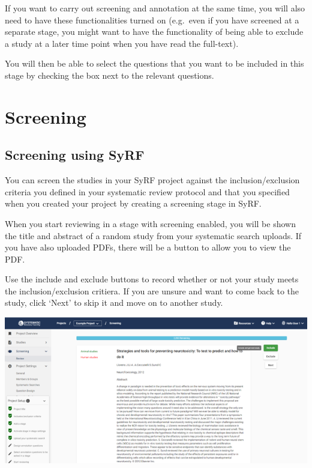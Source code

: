 \documentclass[
]{book}
\begin{document}
If you want to carry out screening and annotation at the same time, you will also need to have these functionalities turned on (e.g.~even if you have screened at a separate stage, you might want to have the functionality of being able to exclude a study at a later time point when you have read the full-text).

You will then be able to select the questions that you want to be included in this stage by checking the box next to the relevant questions.

\hypertarget{projectscreening}{%
\chapter{Screening}\label{projectscreening}}

\hypertarget{screening-using-syrf}{%
\section{Screening using SyRF}\label{screening-using-syrf}}

You can screen the studies in your SyRF project against the inclusion/exclusion criteria you defined in your systematic review protocol and that you specified when you created your project by creating a screening stage in SyRF.

When you start reviewing in a stage with screening enabled, you will be shown the title and abstract of a random study from your systematic search uploads. If you have also uploaded PDFs, there will be a button to allow you to view the PDF.

Use the include and exclude buttons to record whether or not your study meets the inclusion/exclusion critiera. If you are unsure and want to come back to the study, click `Next' to skip it and move on to another study.

\includegraphics[width=1\textwidth,height=1\textheight]{figs/Fig_Screening.png}
\end{document}
